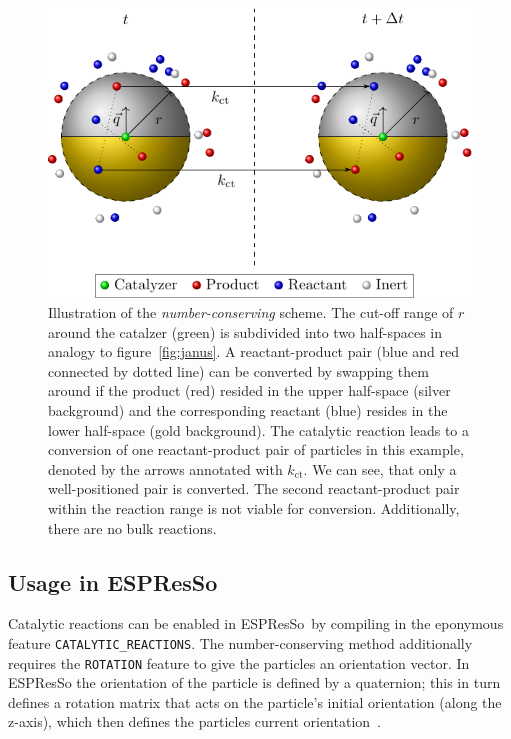 \documentclass[aip,jcp,reprint,a4paper,onecolumn,nofootinbib,amsmath,amssymb]{revtex4-1}
\newcommand\code{\lstinline}
\newcommand{\es}{\mbox{\textsf{ESPResSo}}\xspace}
\begin{document}
\begin{figure}
  \centering
  \includegraphics{FIGURES/number-conserving}
  \caption{Illustration of the \emph{number-conserving} scheme.  The
    cut-off range of $r$ around the catalzer (green) is subdivided
    into two half-spaces in analogy to figure~\ref{fig:janus}.  A
    reactant-product pair (blue and red connected by dotted line) can
    be converted by swapping them around if the product (red) resided
    in the upper half-space (silver background) and the corresponding
    reactant (blue) resides in the lower half-space (gold background).
    The catalytic reaction leads to a conversion of one
    reactant-product pair of particles in this example, denoted by the
    arrows annotated with $k_{\text{ct}}$.  We can see, that only a
    well-positioned pair is converted.  The second reactant-product
    pair within the reaction range is not viable for conversion.
    Additionally, there are no bulk reactions.}
  \label{fig:nc}
\end{figure}

\subsection{Usage in \es}

Catalytic reactions can be enabled in \es\ by compiling in the
eponymous feature \code{CATALYTIC_REACTIONS}.  The number-conserving
method additionally requires the \code{ROTATION} feature to give the
particles an orientation vector.  In \es{} the orientation of the
particle is defined by a quaternion; this in turn defines a rotation
matrix that acts on the particle's initial orientation (along the
z-axis), which then defines the particles current
orientation~\cite{UG,Limbach_06,Arnold_13}.
\end{document}
